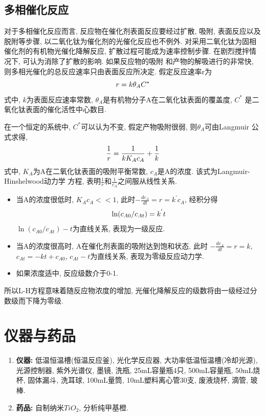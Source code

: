 \documentclass[a4paper]{article}
\begin{document}
\subsection{多相催化反应}
对于多相催化反应而言, 反应物在催化剂表面反应要经过扩散, 吸附, 表面反应以及脱附等步骤, 
以二氧化钛为催化剂的光催化反应也不例外. 对采用二氧化钛为固相催化剂的有机物光催化降解反应, 
扩散过程可能成为速率控制步骤. 在剧烈搅拌情况下, 可认为消除了扩散的影响. 如果反应物的吸附
和产物的解吸进行的非常快, 则多相光催化的总反应速率只由表面反应所决定. 假定反应速率r为
\begin{equation}
	r = k\theta_{A}C^{*}\\
\end{equation}
式中, $k$为表面反应速率常数, $\theta_{A}$是有机物分子A在二氧化钛表面的覆盖度, $C^{*}$
是二氧化钛表面的催化活性中心数目.
\par
在一个恒定的系统中, $C^{*}$可以认为不变, 假定产物吸附很弱, 则$\theta_{A}$可由Langmuir
公式求得, 
\begin{equation}
	\frac{1}{r} = \frac{1}{kK_{A}c_{A}} + \frac{1}{k}\\
\end{equation}
式中, $K_{A}$为A在二氧化钛表面的吸附平衡常数, $c_{A}$是A的浓度. 该式为Langmuir-Hinshelwood动力学
方程, 表明$\frac{1}{r}$和$\frac{1}{c_{A}}$之间服从线性关系.
\begin{itemize}
	\item 当A的浓度很低时, $K_{A}c_{A} << 1$, 此时$-\frac{dc_{A}}{dt} = r = k^{'}c_{A}$, 
	经积分得
	\begin{equation}
		\ln(c_{A0}/c_{At}) = k^{'}t\\
	\end{equation}
	$\ln(c_{A0}/c_{At})-t$为直线关系, 表现为一级反应.
	\item 当A的浓度很高时, A在催化剂表面的吸附达到饱和状态, 
	此时 $-\frac{dc_{A}}{dt} = r = k$, $c_{At} = -kt + c_{A0}$, $c_{At}-t$为直线关系, 
	表现为零级反应动力学.
	\item 如果浓度适中, 反应级数介于0-1.
\end{itemize}
所以L-H方程意味着随反应物浓度的增加, 光催化降解反应的级数将由一级经过分数级而下降为零级.

\section{仪器与药品}
\begin{enumerate}
    \item \textbf{仪器:} 低温恒温槽(恒温反应釜), 光化学反应器, 大功率低温恒温槽(冷却光源), 
	光源控制器, 紫外光谱仪, 墨镜, 洗瓶, 25mL容量瓶4只, 500mL容量瓶, 
	50mL烧杯, 固体漏斗, 洗耳球, 100mL量筒, 10mL塑料离心管30支, 废液烧杯, 滴管, 玻棒.
    \item \textbf{药品:} 自制纳米$TiO_{2}$, 分析纯甲基橙.
\end{enumerate}
\end{document}
